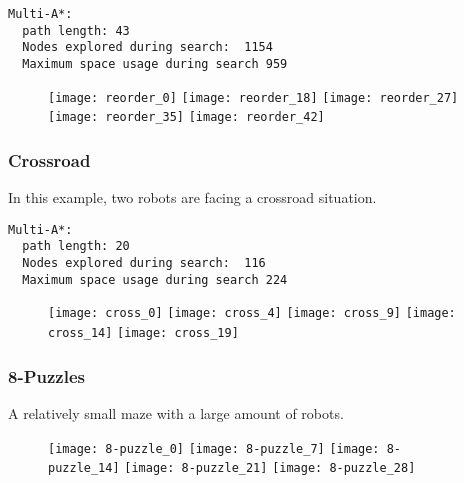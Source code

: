 \documentclass{article}
\begin{document}
\begin{lstlisting}
Multi-A*:  
  path length: 43
  Nodes explored during search:  1154
  Maximum space usage during search 959
\end{lstlisting}

\begin{figure}[!htb]

  \texttt{[image: reorder\_0]}
\endminipage\hfill
{}
  \texttt{[image: reorder\_18]}
\endminipage\hfill
{}
  \texttt{[image: reorder\_27]}
\endminipage
{}
  \texttt{[image: reorder\_35]}
\endminipage
{}
  \texttt{[image: reorder\_42]}
\endminipage
\end{figure}

\clearpage

\subsubsection{Crossroad}
In this example, two robots are facing a crossroad situation.  

\begin{lstlisting}
Multi-A*:  
  path length: 20
  Nodes explored during search:  116
  Maximum space usage during search 224
\end{lstlisting}

\begin{figure}[!htb]

  \texttt{[image: cross\_0]}
\endminipage\hfill
{}
  \texttt{[image: cross\_4]}
\endminipage\hfill
{}
  \texttt{[image: cross\_9]}
\endminipage
{}
  \texttt{[image: cross\_14]}
\endminipage
{}
  \texttt{[image: cross\_19]}
\endminipage
\end{figure}

\clearpage
\subsubsection{8-Puzzles}
A relatively small maze with a large amount of robots.

\begin{figure}[!htb]

  \texttt{[image: 8-puzzle\_0]}
\endminipage\hfill
{}
  \texttt{[image: 8-puzzle\_7]}
\endminipage\hfill
{}
  \texttt{[image: 8-puzzle\_14]}
\endminipage
{}
  \texttt{[image: 8-puzzle\_21]}
\endminipage
{}
  \texttt{[image: 8-puzzle\_28]}
\endminipage
\end{figure}
\end{document}

